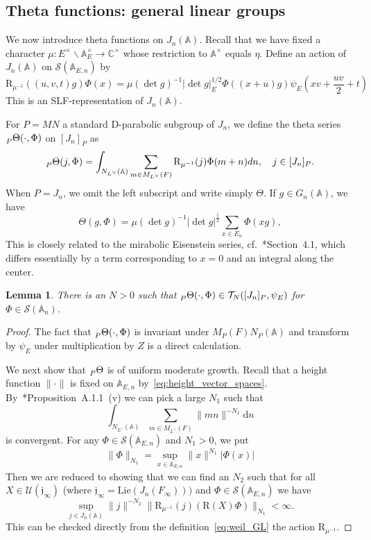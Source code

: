 \documentclass[letterpaper,11pt]{amsart}
\newcommand{\fj}{\mathfrak{j}}
\newcommand{\bA}{\mathbb{A}}
\newcommand{\C}{\mathbb{C}}
\newcommand{\cS}{\mathcal{S}}
\newcommand{\cT}{\mathcal{T}}
\newcommand{\cU}{\mathcal{U}}
\newcommand{\rd}{\mathrm{d}}
\newcommand{\bs}{\backslash}
\newcommand{\<}{\negthickspace}
\providecommand{\abs}[1]{\lvert#1\rvert}
\providecommand{\aabs}[1]{\lVert#1\rVert}
\theoremstyle{definition}
\theoremstyle{plain}
\newtheorem{lemma}[definition]{Lemma}
\theoremstyle{remark}
\numberwithin{equation}{section}
\begin{document}
\subsection{Theta functions: general linear groups}    \label{subsec:theta_series}
We now introduce theta functions on $J_n(\bA)$. Recall that we have
fixed a character $\mu:E^\times \bs \bA_E^\times \to \C^\times$ whose
restriction to $\bA^\times$ equals $\eta$. Define an action of $J_n(\bA)$ on
$\cS(\bA_{E, n})$ by
    \begin{equation}    \label{eq:weil_GL}
    \mathrm{R}_{\mu^{-1}}((u,v,t)g)\Phi(x) = \mu(\det g)^{-1}\abs{\det g}_E^{1/2}
    \Phi((x+u)g) \psi_E \left(xv+\frac{uv}2 + t \right)
    \end{equation}
This is an SLF-representation of $J_n(\bA)$.


For $P = MN$ a standard D-parabolic subgroup of $J_n$, we define the theta
series $\prescript{}{P}{\Theta}(\cdot, \Phi)$ on $[J_n]_{P}$ as
\begin{equation}
\label{eq:theta_gln_P}
     \prescript{}{P}{\Theta}(j, \Phi) =
    \int_{N_{L^\vee}(\bA)} \sum_{m \in M_{L^\vee}(F)} \mathrm{R}_{\mu^{-1}}(j)\Phi(m+n) dn, \quad
    j \in [J_n]_{P}.
\end{equation}
When $P = J_n$, we omit the left subscript and write simply $\Theta$. If $g \in
G_n(\bA)$, we have
    \[
    \Theta(g, \Phi) = \mu(\det g)^{-1} \abs{\det g}^{\frac{1}{2}}
    \sum_{x \in E_n} \Phi(xg),
    \]
This is closely related to the mirabolic Eisenstein series, cf.~\cite{JS}*{Section~4.1}, which
differs essentially by a term corresponding to $x= 0$ and an integral along the center.


\begin{lemma}   \label{lemma:theta_moderate_growth}
There is an $N>0$ such that
$\prescript{}{P}{\Theta}(\cdot, \Phi) \in
\cT_N([J_n]_{P},\psi_E)$ for $\Phi \in \cS(\bA_{n})$.
\end{lemma}

\begin{proof}
The fact that $\prescript{}{P}{\Theta}(\cdot, \Phi)$ is invariant under
$M_{P}(F) N_{P}(\bA)$ and transform by $\psi_E$ under multiplication by $Z$ is
a direct calculation.

We next show that $\prescript{}{P}{\Theta}$ is of uniform moderate growth.
Recall that a height function $\aabs{\cdot}$ is fixed on $\bA_{E, n}$
by~\eqref{eq:height_vector_spaces}. By~\cite{BP}*{Proposition~A.1.1~(v)}
we can pick a large $N_1$ such that
    \[
    \int_{N_{L^\vee}(\bA)} \sum_{m \in M_{L^\vee}(F)}
    \aabs{mn}^{- N_1} \rd n
    \]
is convergent. For any $\Phi \in \cS(\bA_{E, n})$ and $N_1>0$, we put
    \[
    \aabs{\Phi}_{N_1} =
    \sup_{x \in \bA_{E, n}} \aabs{x}^{N_1} \abs{\Phi(x)}
    \]
Then we are reduced to showing that we can find an $N_2$ such that
for all $X \in \cU(\fj_{\infty})$ (where $\fj_{\infty}=\mathrm{Lie}(J_n(F_{\infty})))$ and $\Phi \in \cS(\bA_{E, n})$ we have
    \[
    \sup_{j \in J_n(\bA)} \aabs{j}^{-N_2}
    \aabs{\mathrm{R}_{\mu^{-1}}(j)(\mathrm{R}(X) \Phi)}_{N_1} < \infty.
    \]
This can be checked directly from the definition~\eqref{eq:weil_GL}
the action $\mathrm{R}_{\mu^{-1}}$.
\end{proof}
\end{document}
